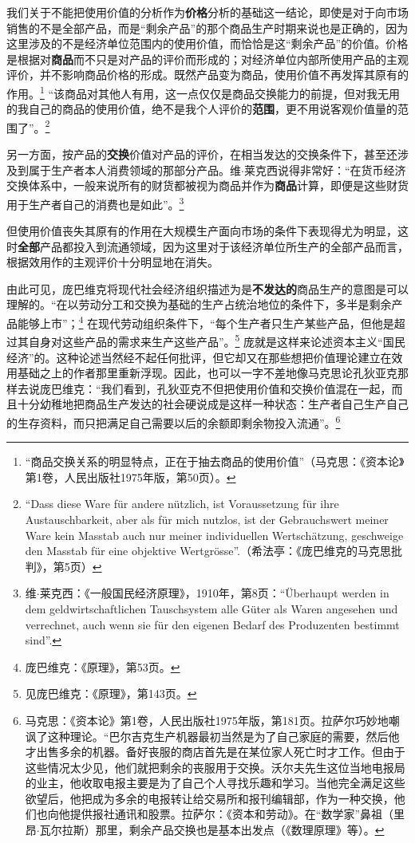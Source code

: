 \documentclass[fontset=fandol, a4paper, 12pt, openright]{ctexbook}
\begin{document}
我们关于不能把使用价值的分析作为\textbf{价格}分析的基础这一结论，即使是对于向市场销售的不是全部产品，而是“剩余产品”的那个商品生产时期来说也是正确的，因为这里涉及的不是经济单位范围内的使用价值，而恰恰是这“剩余产品”的价值。价格是根据对\textbf{商品}而不只是对产品的评价而形成的；对经济单位内部所使用产品的主观评价，并不影响商品价格的形成。既然产品变为商品，使用价值不再发挥其原有的作用。\footnote{“商品交换关系的明显特点，正在于抽去商品的使用价值”（马克思：《资本论》第1卷，人民出版社1975年版，第50页）。} “该商品对其他人有用，这一点仅仅是商品交换能力的前提，但对我无用的我自己的商品的使用价值，绝不是我个人评价的\textbf{范围}，更不用说客观价值量的范围了”。\footnote{“Dass diese Ware f\"{u}r andere n\"{u}tzlich, ist Voraussetzung f\"{u}r ihre Austauschbarkeit, aber als f\"{u}r mich nutzlos, ist der Gebrauchswert meiner Ware kein Masstab auch nur meiner individuellen Wertsch\"{a}tzung, geschweige den Masstab f\"{u}r eine objektive Wertgr\"{o}sse”.（希法亭：《庞巴维克的马克思批判》，第5页）}

另一方面，按产品的\textbf{交换}价值对产品的评价，在相当发达的交换条件下，甚至还涉及到属于生产者本人消费领域的那部分产品。维$\cdot$莱克西说得非常好：“在货币经济交换体系中，一般来说所有的财货都被视为商品并作为\textbf{商品}计算，即便是这些财货用于生产者自己的消费也是如此”。\footnote{维$\cdot$莱克西：《一般国民经济原理》，1910年，第8页：“\"{U}berhaupt werden in dem geldwirtschaftlichen Tauschsystem alle G\"{u}ter als Waren angesehen und verrechnet, auch wenn sie f\"{u}r den eigenen Bedarf des Produzenten bestimmt sind”.}

但使用价值丧失其原有的作用在大规模生产面向市场的条件下表现得尤为明显，这时\textbf{全部}产品都投入到流通领域，因为这里对于该经济单位所生产的全部产品而言，根据效用作的主观评价十分明显地在消失。

由此可见，庞巴维克将现代社会经济组织描述为是\textbf{不发达的}商品生产的意图是可以理解的。“在以劳动分工和交换为基础的生产占统治地位的条件下，多半是剩余产品能够上市”；\footnote{庞巴维克：《原理》，第53页。} 在现代劳动组织条件下，“每个生产者只生产某些产品，但他是超过其自身对这些产品的需求来生产这些产品”。\footnote{见庞巴维克：《原理》，第143页。} 庞就是这样来论述资本主义“国民经济”的。这种论述当然经不起任何批评，但它却又在那些想把价值理论建立在效用基础之上的作者那里重新浮现。因此，也可以一字不差地像马克思论孔狄亚克那样去说庞巴维克：“我们看到，孔狄亚克不但把使用价值和交换价值混在一起，而且十分幼稚地把商品生产发达的社会硬说成是这样一种状态：生产者自己生产自己的生存资料，而只把满足自己需要以后的余额即剩余物投入流通”。\footnote{马克思：《资本论》第1卷，人民出版社1975年版，第181页。拉萨尔巧妙地嘲讽了这种理论。“巴尔吉克生产机器最初当然是为了自己家庭的需要，然后他才出售多余的机器。备好丧服的商店首先是在某位家人死亡时才工作。但由于这些情况太少见，他们就把剩余的丧服用于交换。沃尔夫先生这位当地电报局的业主，他收取电报主要是为了自己个人寻找乐趣和学习。当他完全满足这些欲望后，他把成为多余的电报转让给交易所和报刊编辑部，作为一种交换，他们也向他提供报社通讯和股票。拉萨尔：《资本和劳动》。在“数学家”鼻祖（里昂$\cdot$瓦尔拉斯）那里，剩余产品交换也是基本出发点（《数理原理》等）。}
\end{document}
